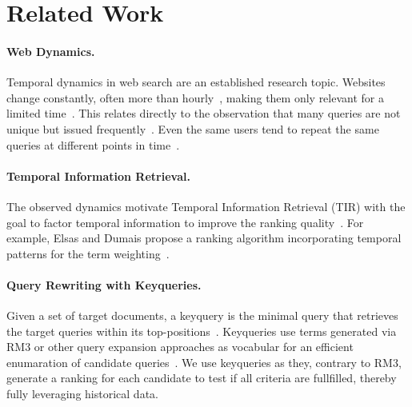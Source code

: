 \enlargethispage*{2\baselineskip}

\section{Related Work}
\label{sec:related-work}

\paragraph{Web Dynamics.} Temporal dynamics in web search are an established research topic. Websites change constantly, often more than hourly~\cite{DBLP:conf/wsdm/AdarTDE09},
making them only relevant for a limited time~\cite{DBLP:conf/sigir/TikhonovBBOKG13}. This relates directly to the observation that many queries are not unique but issued frequently~\cite{DBLP:conf/sigir/Dumais14,DBLP:journals/sigir/SilversteinHMM99}. Even the same users tend to repeat the same queries at different points in time~\cite{DBLP:conf/wsdm/TylerT10}.

\vspace*{-1ex}

\paragraph{Temporal Information Retrieval.} The observed dynamics motivate Temporal Information Retrieval (TIR) with the goal to factor temporal information to improve the ranking quality~\cite{DBLP:journals/ftir/KanhabuaBN15,DBLP:journals/csur/CamposDJJ14}. For example, Elsas and Dumais propose a ranking algorithm incorporating temporal patterns for the term weighting~\cite{DBLP:conf/wsdm/ElsasD10}.

\vspace*{-1ex}

\paragraph{Query Rewriting with Keyqueries.} Given a set of target documents, a keyquery is the minimal query that retrieves the target queries within its top-positions~\cite{gollub:2013a,hagen:2016b}. Keyqueries use terms generated via RM3 or other query expansion approaches as vocabular for an efficient enumaration of candidate queries~\cite{froebe:2022c,froebe:2021c}. We use keyqueries as they, contrary to RM3, generate a ranking for each candidate to test if all criteria are fullfilled, thereby fully leveraging historical data.

